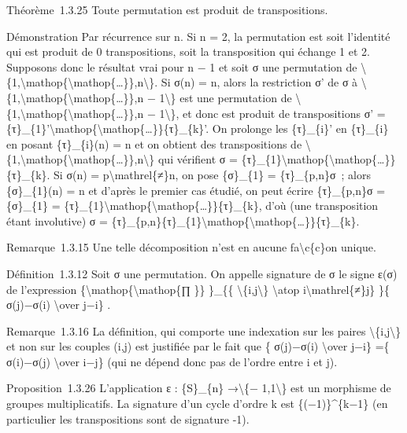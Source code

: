 \documentclass[]{article}
\begin{document}
Théorème~1.3.25 Toute permutation est produit de transpositions.

Démonstration Par récurrence sur n. Si n = 2, la permutation est soit
l'identité qui est produit de 0 transpositions, soit la transposition
qui échange 1 et 2. Supposons donc le résultat vrai pour n − 1 et soit σ
une permutation de
\textbackslash{}\{1,\textbackslash{}mathop\{\textbackslash{}mathop\{\ldots{}\}\},n\textbackslash{}\}.
Si σ(n) = n, alors la restriction σ' de σ à
\textbackslash{}\{1,\textbackslash{}mathop\{\textbackslash{}mathop\{\ldots{}\}\},n
− 1\textbackslash{}\} est une permutation de
\textbackslash{}\{1,\textbackslash{}mathop\{\textbackslash{}mathop\{\ldots{}\}\},n
− 1\textbackslash{}\}, et donc est produit de transpositions σ' =
\{τ\}\_\{1\}'\textbackslash{}mathop\{\textbackslash{}mathop\{\ldots{}\}\}\{τ\}\_\{k\}'.
On prolonge les \{τ\}\_\{i\}' en \{τ\}\_\{i\} en posant \{τ\}\_\{i\}(n)
= n et on obtient des transpositions de
\textbackslash{}\{1,\textbackslash{}mathop\{\textbackslash{}mathop\{\ldots{}\}\},n\textbackslash{}\}
qui vérifient σ =
\{τ\}\_\{1\}\textbackslash{}mathop\{\textbackslash{}mathop\{\ldots{}\}\}\{τ\}\_\{k\}.
Si σ(n) = p\textbackslash{}mathrel\{≠\}n, on pose \{σ\}\_\{1\} =
\{τ\}\_\{p,n\}σ~; alors \{σ\}\_\{1\}(n) = n et d'après le premier cas
étudié, on peut écrire \{τ\}\_\{p,n\}σ = \{σ\}\_\{1\} =
\{τ\}\_\{1\}\textbackslash{}mathop\{\textbackslash{}mathop\{\ldots{}\}\}\{τ\}\_\{k\},
d'où (une transposition étant involutive) σ =
\{τ\}\_\{p,n\}\{τ\}\_\{1\}\textbackslash{}mathop\{\textbackslash{}mathop\{\ldots{}\}\}\{τ\}\_\{k\}.

Remarque~1.3.15 Une telle décomposition n'est en aucune
fa\textbackslash{}c\{c\}on unique.

Définition~1.3.12 Soit σ une permutation. On appelle signature de σ le
signe ε(σ) de l'expression
\{\textbackslash{}mathop\{\textbackslash{}mathop\{∏ \}\} \}\_\{\{
\textbackslash{}\{i,j\textbackslash{}\} \textbackslash{}atop
i\textbackslash{}mathrel\{≠\}j\} \}\{ σ(j)−σ(i) \textbackslash{}over
j−i\} .

Remarque~1.3.16 La définition, qui comporte une indexation sur les
paires \textbackslash{}\{i,j\textbackslash{}\} et non sur les couples
(i,j) est justifiée par le fait que \{ σ(j)−σ(i) \textbackslash{}over
j−i\} =\{ σ(i)−σ(j) \textbackslash{}over i−j\} (qui ne dépend donc pas
de l'ordre entre i et j).

Proposition~1.3.26 L'application ε : \{S\}\_\{n\} →\textbackslash{}\{−
1,1\textbackslash{}\} est un morphisme de groupes multiplicatifs. La
signature d'un cycle d'ordre k est \{(−1)\}\^{}\{k−1\} (en particulier
les transpositions sont de signature -1).
\end{document}
